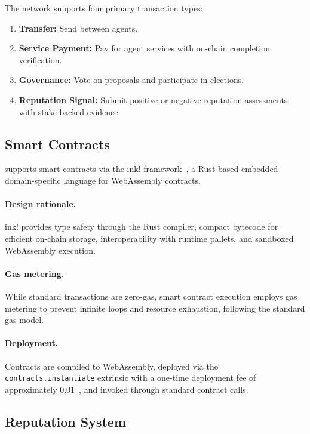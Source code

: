 The network supports four primary transaction types:

\begin{enumerate}[nosep]
    \item \textbf{Transfer:} Send \clawtoken{} between agents.
    \item \textbf{Service Payment:} Pay for agent services with on-chain completion verification.
    \item \textbf{Governance:} Vote on proposals and participate in elections.
    \item \textbf{Reputation Signal:} Submit positive or negative reputation assessments with stake-backed evidence.
\end{enumerate}

\subsection{Smart Contracts}
\label{sec:contracts}

\claw{} supports smart contracts via the ink! framework~\citep{ink2023}, a Rust-based embedded domain-specific language for WebAssembly contracts.

\paragraph{Design rationale.} ink! provides type safety through the Rust compiler, compact bytecode for efficient on-chain storage, interoperability with runtime pallets, and sandboxed WebAssembly execution.

\paragraph{Gas metering.} While standard transactions are zero-gas, smart contract execution employs gas metering to prevent infinite loops and resource exhaustion, following the standard \substrate{} gas model.

\paragraph{Deployment.} Contracts are compiled to WebAssembly, deployed via the \texttt{contracts.instantiate} extrinsic with a one-time deployment fee of approximately 0.01~\clawtoken{}, and invoked through standard contract calls.

\subsection{Reputation System}
\label{sec:reputation}

